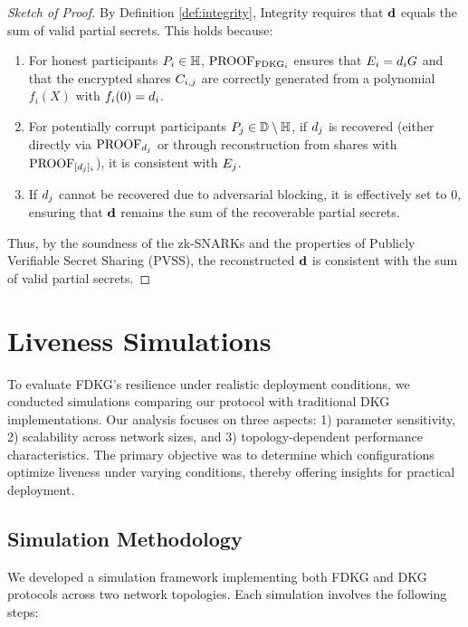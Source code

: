 \documentclass[lettersize,journal]{IEEEtran}
\theoremstyle{definition}
\begin{document}
\begin{proof}[Sketch of Proof]
By Definition \ref{def:integrity}, Integrity requires that \(\textbf{d}{}\) equals the sum of valid partial secrets. This holds because:
\begin{enumerate}
    \item For honest participants \(P_{i} \in \mathbb{H}\), \(\textrm{PROOF}_{\textrm{FDKG}_{i}}\) ensures that \(E_{i} = d_{i} G\) and that the encrypted shares \(C_{i,j}\) are correctly generated from a polynomial \(f_i(X)\) with \(f_i(0) = d_{i}\).
    \item For potentially corrupt participants \(P_{j} \in \mathbb{D} \setminus \mathbb{H}\), if \(d_{j}\) is recovered (either directly via \(\textrm{PROOF}_{d_{j}}\) or through reconstruction from shares with \(\textrm{PROOF}_{[d_{j}]_{i}}\)), it is consistent with \(E_{j}\).
    \item If \(d_{j}\) cannot be recovered due to adversarial blocking, it is effectively set to \(0\), ensuring that \(\textbf{d}{}\) remains the sum of the recoverable partial secrets.
\end{enumerate}
Thus, by the soundness of the zk-SNARKs and the properties of Publicly Verifiable Secret Sharing (PVSS), the reconstructed \(\textbf{d}{}\) is consistent with the sum of valid partial secrets.
\end{proof}

\section{Liveness Simulations}
\label{sec:liveness_simulations}

To evaluate FDKG's resilience under realistic deployment conditions, we conducted simulations comparing our protocol with traditional DKG implementations. Our analysis focuses on three aspects: 1) parameter sensitivity, 2) scalability across network sizes, and 3) topology-dependent performance characteristics. The primary objective was to determine which configurations optimize liveness under varying conditions, thereby offering insights for practical deployment.

\subsection{Simulation Methodology}
\label{subsec:methodology}

We developed a simulation framework implementing both FDKG and DKG protocols across two network topologies. Each simulation involves the following steps:
\end{document}
